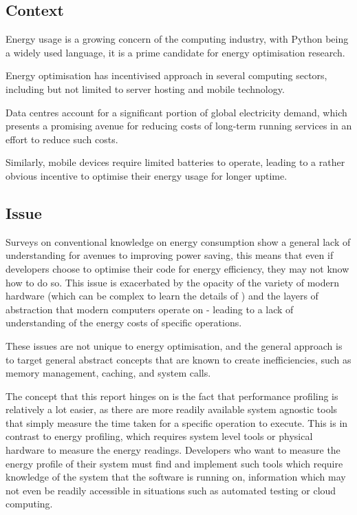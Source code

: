 \subsection{Context}\label{subsec:context}
Energy usage is a growing concern of the computing industry\cite{FrontierEnergyUsage,HistoricalComputingEnergyTrends},
with Python being a widely used language\cite{TIOBE}, it is a prime candidate for energy optimisation research.

Energy optimisation has incentivised approach in several computing sectors, including but not limited to server hosting
and mobile technology.

Data centres account for a significant portion of global electricity demand\cite{IEADataCentres}, which presents a
promising avenue for reducing costs of long-term running services in an effort to reduce such
costs\cite{KIOCostsOfDataCentre, AssetSpireDataCosts}.

Similarly, mobile devices require limited batteries to operate, leading to a rather obvious incentive to optimise their
energy usage for longer uptime\cite{SmartPhoneFeatures}.

\subsection{Issue}\label{subsec:issue}
Surveys on conventional knowledge on energy consumption show a general lack of understanding for avenues to improving
power saving\cite{EnergyConsumptionKnowledge}, this means that even if developers choose to optimise their code for
energy efficiency, they may not know how to do so.
This issue is exacerbated by the opacity of the variety of modern hardware (which can be complex to learn the details of
) and the layers of abstraction that modern computers operate on - leading to a lack of understanding of the energy
costs of specific operations.

These issues are not unique to energy optimisation, and the general approach is to target general abstract concepts
that are known to create inefficiencies, such as memory management, caching, and system calls.

The concept that this report hinges on is the fact that performance profiling is relatively a lot easier, as there
are more readily available system agnostic tools that simply measure the time taken for a specific operation to
execute.
This is in contrast to energy profiling, which requires system level tools or physical hardware to measure the energy
readings.
Developers who want to measure the energy profile of their system must find and implement such tools which require
knowledge of the system that the software is running on, information which may not even be readily accessible in
situations such as automated testing or cloud computing.

